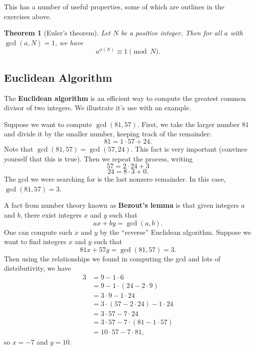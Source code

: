 \documentclass{article}
\newtheorem{theorem}{Theorem}%
\theoremstyle{definition}
\theoremstyle{remark}
\begin{document}
        This has a number of useful properties, some of which are outlines in the exercises above.

        \begin{theorem}[Euler's theorem]
            Let \(N\) be a positive integer.
            Then for all \(a\) with \(\gcd(a,N)=1\), we have
            \[a^{\phi(N)}\equiv 1\pmod{N}.\]
        \end{theorem}

    \subsection{Euclidean Algorithm}

        The \textbf{Euclidean algorithm} is an efficient way to compute the greatest common divisor of two integers.
        We illustrate it's use with an example.
        
        Suppose we want to compute \(\gcd(81,57)\).
        First, we take the larger number \(81\) and divide it by the smaller number, keeping track of the remainder:
        \[81 = 1\cdot 57 + 24.\]
        Note that \(\gcd(81,57)=\gcd(57,24)\).
        This fact is very important (convince yourself that this is true).
        Then we repeat the process, writing
        \[57 = 2\cdot 24 + 3\]
        \[24 = 8\cdot 3 + 0.\]
        The gcd we were searching for is the last nonzero remainder.
        In this case, \(\gcd(81,57) = 3\).

        A fact from number theory known as \textbf{Bezout's lemma} is that given integers \(a\) and \(b\), there exist integers \(x\) and \(y\) such that
        \[ax + by = \gcd(a,b).\]
        One can compute such \(x\) and \(y\) by the ``reverse'' Euclidean algorithm.
        Suppose we want to find integers \(x\) and \(y\) such that
        \[81x + 57y = \gcd(81,57) = 3.\]
        Then using the relationships we found in computing the gcd and lots of distributivity, we have
        \begin{align*}
            3 &= 9 - 1\cdot 6\\
            &= 9 - 1\cdot(24 - 2\cdot 9)\\
            &= 3\cdot 9 - 1\cdot 24\\
            &= 3\cdot(57 - 2\cdot 24) - 1\cdot 24\\ 
            &= 3\cdot 57 - 7\cdot 24\\
            &= 3\cdot 57 - 7\cdot (81 - 1\cdot 57)\\
            &= 10\cdot 57 - 7\cdot 81,
        \end{align*}
        so \(x = -7\) and \(y=10\).
\end{document}

